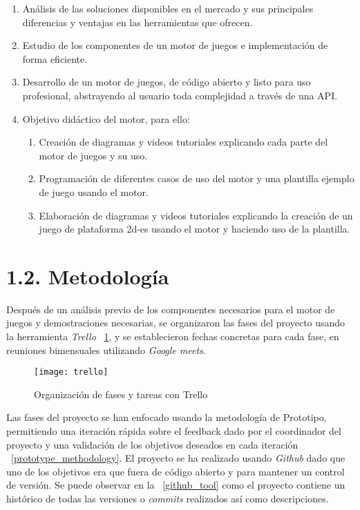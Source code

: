 \begin{enumerate}[label=\textbf{O\arabic*.}]
    \item Análisis de las soluciones disponibles en el mercado y sus principales diferencias y ventajas en las herramientas que ofrecen.
    \item Estudio de los componentes de un motor de juegos e implementación de forma eficiente.
    \item Desarrollo de un motor de juegos, de código abierto y listo para uso profesional, abstrayendo al usuario toda complejidad a través de una API.
    \item Objetivo didáctico del motor, para ello:
    \begin{enumerate}[label=\textbf{O4.\arabic*.}]
        \item Creación de diagramas y videos tutoriales explicando cada parte del motor de juegos y su uso.
        \item Programación de diferentes casos de uso del motor y una plantilla ejemplo de juego usando el motor.
        \item Elaboración de diagramas y videos tutoriales explicando la creación de un juego de plataforma
         \gls{2d-es} usando el motor y haciendo uso de la plantilla.
    \end{enumerate}
\end{enumerate}

\newpage

\section*{1.2. Metodología}\label{sec:methodology}

Después de un análisis previo de los componentes necesarios para el motor de juegos y demostraciones necesarias,
se organizaron las fases del proyecto usando la herramienta \textit{Trello} \figurename~\ref{trello_tool}, y se establecieron fechas concretas para
cada fase, en reuniones bimensuales utilizando \textit{Google meets}.
\begin{figure}[h!]
    \centering
    \texttt{[image: trello]}
    \caption{Organización de fases y tareas con Trello}
    \label{trello_tool}
\end{figure}

Las fases del proyecto se han enfocado usando la metodología de Prototipo, permitiendo una iteración rápida
sobre el feedback dado por el coordinador del proyecto y una validación de los objetivos deseados en cada iteración \figurename~\ref{prototype_methodology}.
El proyecto se ha realizado usando \textit{Github} dado que uno de los objetivos era que fuera de código abierto y para
mantener un control de versión. Se puede observar en la \figurename~\ref{github_tool} como el proyecto 
contiene un histórico de todas las versiones o \textit{commits} realizados así como descripciones.

